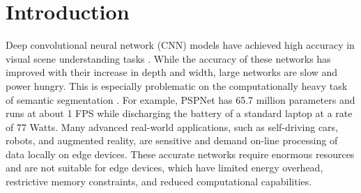 \documentclass[runningheads]{llncs}
\begin{document}
\section{Introduction}
Deep convolutional neural network (CNN) models have achieved high accuracy in visual scene understanding tasks \cite{zhao2017pyramid,he2014spatial,chen2016deeplab}. While the accuracy of these networks has improved with their increase in depth and width, large networks are slow and power hungry. This is especially problematic on the computationally heavy task of semantic segmentation \cite{ess2009segmentation,geiger2013vision,cordts2016cityscapes,menze2015object,franke2013making,xiang2017rnn,kundu2014joint}.
For example, PSPNet \cite{zhao2017pyramid} has 65.7 million parameters and runs at about 1 FPS while discharging the battery of a standard laptop at a rate of 77 Watts. Many advanced real-world applications, such as self-driving cars, robots, and augmented reality, are sensitive and demand on-line processing of data locally on edge devices. These accurate networks require enormous resources and are not suitable for edge devices, which have limited energy overhead, restrictive memory constraints, and reduced computational capabilities.
\end{document}
